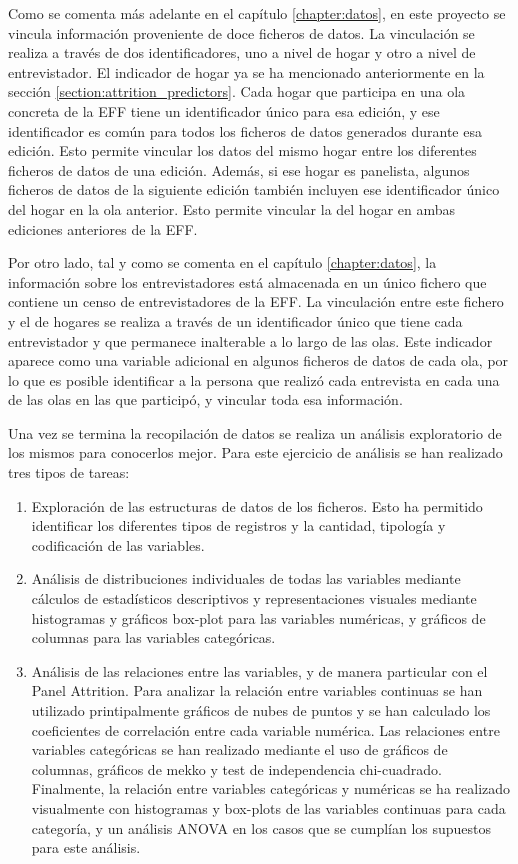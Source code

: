 Como se comenta más adelante en el capítulo \ref{chapter:datos}, en este proyecto se vincula información proveniente de doce ficheros de datos. La vinculación se realiza a través de dos identificadores, uno a nivel de hogar y otro a nivel de entrevistador. El indicador de hogar ya se ha mencionado anteriormente en la sección \ref{section:attrition_predictors}. Cada hogar que participa en una ola concreta de la EFF tiene un identificador único para esa edición, y ese identificador es común para todos los ficheros de datos generados durante esa edición. Esto permite vincular los datos del mismo hogar entre los diferentes ficheros de datos de una edición. Además, si ese hogar es panelista, algunos ficheros de datos de la siguiente edición también incluyen ese identificador único del hogar en la ola anterior. Esto permite vincular la del hogar en ambas ediciones anteriores de la EFF.

Por otro lado, tal y como se comenta en el capítulo \ref{chapter:datos}, la información sobre los entrevistadores está almacenada en un único fichero que contiene un censo de entrevistadores de la EFF. La vinculación entre este fichero y el de hogares se realiza a través de un identificador único que tiene cada entrevistador y que permanece inalterable a lo largo de las olas. Este indicador aparece como una variable adicional en algunos ficheros de datos de cada ola, por lo que es posible identificar a la persona que realizó cada entrevista en cada una de las olas en las que participó, y vincular toda esa información.

Una vez se termina la recopilación de datos se realiza un análisis exploratorio de los mismos para conocerlos mejor. Para este ejercicio de análisis se han realizado tres tipos de tareas:

\begin{enumerate}[noitemsep]
    \item Exploración de las estructuras de datos de los ficheros. Esto ha permitido identificar los diferentes tipos de registros y la cantidad, tipología y codificación de las variables.
    \item Análisis de distribuciones individuales de todas las variables mediante cálculos de estadísticos descriptivos y representaciones visuales mediante histogramas y gráficos box-plot para las variables numéricas, y gráficos de columnas para las variables categóricas.
    \item Análisis de las relaciones entre las variables, y de manera particular con el Panel Attrition. Para analizar la relación entre variables continuas se han utilizado printipalmente gráficos de nubes de puntos y se han calculado los coeficientes de correlación entre cada variable numérica. Las relaciones entre variables categóricas se han realizado mediante el uso de gráficos de columnas, gráficos de mekko y test de independencia chi-cuadrado. Finalmente, la relación entre variables categóricas y numéricas se ha realizado visualmente con histogramas y box-plots de las variables continuas para cada categoría, y un análisis ANOVA en los casos que se cumplían los supuestos para este análisis.
\end{enumerate}

